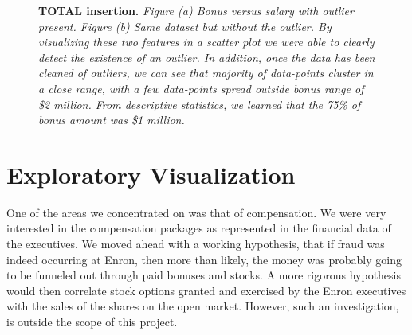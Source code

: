\documentclass[twoside,openright,titlepage,numbers=noenddot,headinclude,%
               footinclude=true,cleardoublepage=empty,abstractoff,BCOR=5mm,%
               paper=a4,fontsize=11pt,ngerman,american]{scrreprt}
\numberwithin{theorem}{chapter}
\numberwithin{definition}{chapter}
\numberwithin{algorithm}{chapter}
\numberwithin{figure}{chapter}
\numberwithin{table}{chapter}
\numberwithin{equation}{chapter}
\begin{document}
\begin{figure}[!hbtp]
\centering
    
    \caption{\textbf{TOTAL insertion.} \textit{Figure (a) Bonus versus salary with outlier present. Figure (b) Same dataset but without the outlier. By visualizing these two features in a scatter plot we were able to clearly detect the existence of an outlier. In addition, once the data has been cleaned of outliers, we can see that majority of data-points cluster in a close range, with a few data-points spread outside bonus range of \$2 million. From descriptive statistics, we learned that the 75\% of bonus amount was \$1 million. }}
\end{figure}




\section*{Exploratory Visualization}

One of the areas we concentrated on was that of compensation. We were very interested in the compensation packages as represented in the financial data of the executives. We moved ahead with a working hypothesis, that if fraud was indeed occurring at Enron, then more than likely, the money was probably going to be funneled out through paid bonuses and stocks. A more rigorous hypothesis would then correlate stock options granted and exercised by the Enron executives with the sales of the shares on the open market. However, such an investigation, is outside the scope of this project. 
\end{document}
